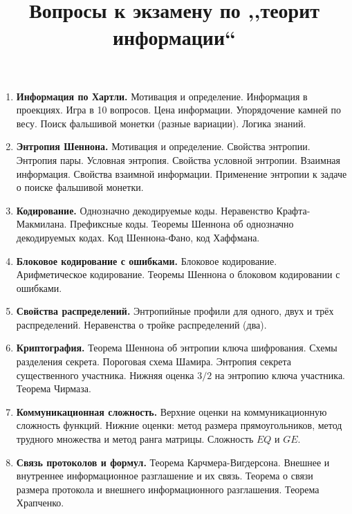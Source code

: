 \documentclass[12pt]{article}
\title{Вопросы к экзамену по ,,теорит информации``}
\theoremstyle{definition}
\theoremstyle{plain}
\theoremstyle{remark}
\begin{document}
\maketitle


\begin{enumerate}
    \item \textbf{Информация по Хартли.} Мотивация и определение. Информация в проекциях.
        Игра в 10 вопросов. Цена информации. Упорядочение камней по весу.
        Поиск фальшивой монетки (разные вариации).
        Логика знаний.

    \item \textbf{Энтропия Шеннона.} Мотивация и определение. Свойства энтропии. Энтропия пары.
        Условная энтропия. Свойства условной энтропии.
	    Взаимная информация. Свойства взаимной информации.
	    Применение энтропии к задаче о поиске фальшивой монетки.
	    
	\item \textbf{Кодирование.} Однозначно декодируемые коды.
	Неравенство Крафта-Макмилана. Префиксные коды. 
	Теоремы Шеннона об однозначно декодируемых кодах.
	Код Шеннона-Фано, код Хаффмана. 

	\item \textbf{Блоковое кодирование с ошибками.}
	Блоковое кодирование. Арифметическое кодирование.
	Теоремы Шеннона о блоковом кодировании с ошибками.
	
	\item \textbf{Свойства распределений.} Энтропийные профили 
	для одного, двух и трёх распределений. Неравенства о тройке распределений (два).
	
	\item \textbf{Криптография.} Теорема Шеннона об энтропии ключа шифрования. Схемы разделения секрета. Пороговая схема Шамира.
	Энтропия секрета существенного участника.
	Нижняя оценка $3/2$ на энтропию ключа участника. Теорема Чирмаза.

	\item \textbf{Коммуникационная сложность.} Верхние оценки на
	коммуникационную сложность функций. Нижние оценки: метод
	размера прямоугольников, метод трудного множества и метод ранга
	матрицы. Сложность $EQ$ и $GE$.
	
	\item \textbf{Связь протоколов и формул.} Теорема Карчмера-Вигдерсона. Внешнее и внутреннее информационное разглашение и их связь. Теорема о связи размера протокола
	и внешнего информационного разглашения. Теорема Храпченко.
	

\end{enumerate}
\end{document}
